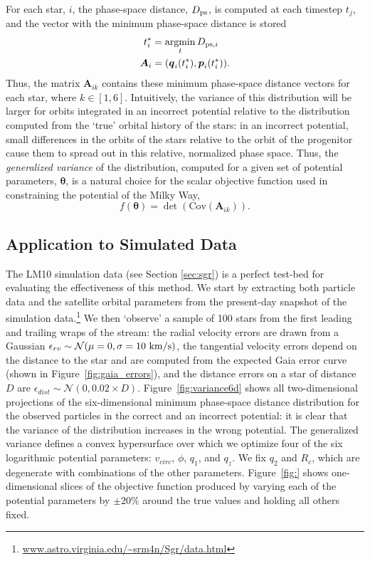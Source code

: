 \documentclass[preprint]{aastex}
\newcommand{\bs}{\boldsymbol}
\newcommand{\argmin}{\operatornamewithlimits{argmin}}
\begin{document}

For each star, $i$,
the phase-space distance, $D_{\rm ps}$, is computed at each timestep
$t_{j}$, and the vector with the minimum phase-space distance is stored
\begin{align}
  t^*_{i} &= \argmin_{t} D_{{\rm ps},i}\\
  \bs{A}_{i} &= (\bs{q}_{i}(t^*_{i}),\bs{p}_{i}(t^*_{i})).
\end{align}
Thus, the matrix $\bs{A}_{ik}$ contains these minimum phase-space distance vectors for each star,
where $k\in[1,6]$. Intuitively, the variance of this distribution
will be larger for orbits integrated in an incorrect potential
relative to the distribution computed from the `true' orbital history
of the stars: in an incorrect potential, small differences in the
orbits of the stars relative to the orbit of the progenitor cause them
to spread out in this relative, normalized phase space. Thus, the
\emph{generalized variance} of the distribution, computed for a given
set of potential parameters, $\bs{\theta}$, is a natural choice for
the scalar objective function used in constraining the potential of
the Milky Way,
\begin{equation}
  f(\bs{\theta})=\det(\mathrm{Cov}( \bs{A}_{ik})).
\end{equation}

\subsection{Application to Simulated Data}
The LM10 simulation data (see Section \ref{sec:sgr}) is a perfect
test-bed for evaluating the effectiveness of this method. We start by
extracting both particle data and the satellite orbital parameters
from the present-day snapshot of the simulation
data.\footnote{\url{www.astro.virginia.edu/~srm4n/Sgr/data.html}} We then
`observe' a sample of 100 stars from the first leading and trailing
wraps of the stream: the radial velocity errors are drawn from a
Gaussian $\epsilon_{rv} \sim \mathcal{N}(\mu=0,\sigma=10~{\rm km/s})$,
the tangential velocity errors depend on the distance to the star and
are computed from the expected Gaia error curve (shown in
Figure~\ref{fig:gaia_errors}), and the distance errors on a star of distance
$D$ are $\epsilon_{dist} \sim \mathcal{N}(0,0.02\times
D)$. Figure~\ref{fig:variance6d} shows all two-dimensional projections of the six-dimensional minimum
phase-space distance distribution for the observed particles in the
correct and an incorrect potential: it is clear that the
variance of the distribution increases in the wrong potential. The 
generalized variance defines a convex hypersurface over which we
optimize four of the six logarithmic potential parameters:
$v_{circ}$, $\phi$, $q_1$, and $q_z$. We fix $q_2$ and $R_c$, which are degenerate with combinations of the other parameters. Figure~\ref{fig:} shows one-dimensional slices of the objective function
produced by varying each of the potential parameters by
$\pm20\%$ around the true values and holding all others fixed.
\end{document}
